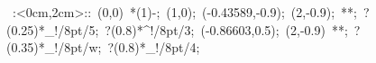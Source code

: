 %


\hbox{
\xy    <2cm,0cm>:<0cm,2cm>::
       (0,0) *\ellipse(1){-}; (1,0);
       (-0.43589,-0.9); (2,-0.9); **\dir{-};
       ?(0.25)*_!/8pt/{5};  ?(0.8)*^!/8pt/{3}; 
       (-0.86603,0.5); (2,-0.9) **\dir{-}; 
       ?(0.35)*_!/8pt/{w};  ?(0.8)*_!/8pt/{4}; 
\endxy}


